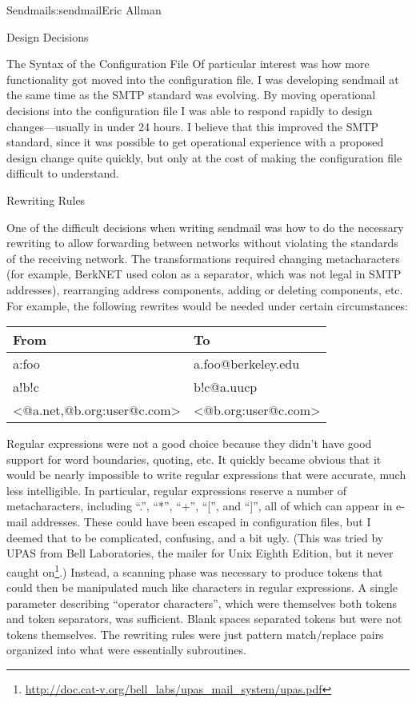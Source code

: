 \begin{aosachapter}{Sendmail}{s:sendmail}{Eric Allman}
\begin{aosasect1}{Design Decisions}
\begin{aosasect2}{The Syntax of the Configuration File}
Of particular interest was how more functionality got moved into the
configuration file. I was developing sendmail at the same time as the
SMTP standard was evolving. By moving operational decisions into the
configuration file I was able to respond rapidly to design
changes---usually in under 24 hours. I believe that this improved the
SMTP standard, since it was possible to get operational experience
with a proposed design change quite quickly, but only at the cost of
making the configuration file difficult to understand.

\end{aosasect2}

\begin{aosasect2}{Rewriting Rules}

One of the difficult decisions when writing sendmail was how to do the
necessary rewriting to allow forwarding between networks without
violating the standards of the receiving network. The transformations
required changing metacharacters (for example, BerkNET used colon as a
separator, which was not legal in SMTP addresses), rearranging address
components, adding or deleting components, etc. For example, the
following rewrites would be needed under certain circumstances:

\begin{table}[h!]\centering
\begin{tabular}{|ll|}
\hline
From & To \\
\hline
a:foo & a.foo@berkeley.edu \\
a!b!c & b!c@a.uucp \\
{\textless}@a.net,@b.org:user@c.com{\textgreater} & {\textless}@b.org:user@c.com{\textgreater} \\
\hline
\end{tabular}
\end{table}

Regular expressions were not a good choice because they didn't have
good support for word boundaries, quoting, etc. It quickly became
obvious that it would be nearly impossible to write regular
expressions that were accurate, much less intelligible. In particular,
regular expressions reserve a number of metacharacters, including
``.'', ``*'', ``+'', ``{[}'', and ``{]}'', all of which can appear in
e-mail addresses. These could have been escaped in configuration files,
but I deemed that to be complicated, confusing, and a bit
ugly. (This was tried by UPAS from Bell Laboratories, the mailer for
Unix Eighth Edition, but it never caught
on\footnote{\url{http://doc.cat-v.org/bell_labs/upas_mail_system/upas.pdf}}.)
Instead, a scanning phase was necessary to produce tokens that could
then be manipulated much like characters in regular expressions. A
single parameter describing ``operator characters'', which were
themselves both tokens and token separators, was sufficient. Blank
spaces separated tokens but were not tokens themselves. The rewriting
rules were just pattern match/replace pairs organized into what were
essentially subroutines.


\end{aosasect2}
\end{aosasect1}
\end{aosachapter}
